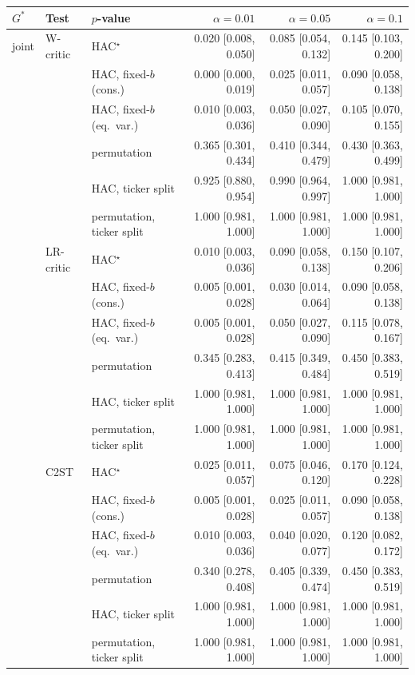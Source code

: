 \begin{tabular}{lllrrr}
\toprule
$G^*$ & Test & $p$-value & $\alpha=0.01$ & $\alpha=0.05$ & $\alpha=0.1$ \\
\midrule
joint & W-critic & HAC$^{\star}$ & 0.020 [0.008, 0.050] & 0.085 [0.054, 0.132] & 0.145 [0.103, 0.200] \\
 &  & HAC, fixed-$b$ (cons.) & 0.000 [0.000, 0.019] & 0.025 [0.011, 0.057] & 0.090 [0.058, 0.138] \\
 &  & HAC, fixed-$b$ (eq.\ var.) & 0.010 [0.003, 0.036] & 0.050 [0.027, 0.090] & 0.105 [0.070, 0.155] \\
 &  & permutation & 0.365 [0.301, 0.434] & 0.410 [0.344, 0.479] & 0.430 [0.363, 0.499] \\
 &  & HAC, ticker split & 0.925 [0.880, 0.954] & 0.990 [0.964, 0.997] & 1.000 [0.981, 1.000] \\
 &  & permutation, ticker split & 1.000 [0.981, 1.000] & 1.000 [0.981, 1.000] & 1.000 [0.981, 1.000] \\
 & LR-critic & HAC$^{\star}$ & 0.010 [0.003, 0.036] & 0.090 [0.058, 0.138] & 0.150 [0.107, 0.206] \\
 &  & HAC, fixed-$b$ (cons.) & 0.005 [0.001, 0.028] & 0.030 [0.014, 0.064] & 0.090 [0.058, 0.138] \\
 &  & HAC, fixed-$b$ (eq.\ var.) & 0.005 [0.001, 0.028] & 0.050 [0.027, 0.090] & 0.115 [0.078, 0.167] \\
 &  & permutation & 0.345 [0.283, 0.413] & 0.415 [0.349, 0.484] & 0.450 [0.383, 0.519] \\
 &  & HAC, ticker split & 1.000 [0.981, 1.000] & 1.000 [0.981, 1.000] & 1.000 [0.981, 1.000] \\
 &  & permutation, ticker split & 1.000 [0.981, 1.000] & 1.000 [0.981, 1.000] & 1.000 [0.981, 1.000] \\
 & C2ST & HAC$^{\star}$ & 0.025 [0.011, 0.057] & 0.075 [0.046, 0.120] & 0.170 [0.124, 0.228] \\
 &  & HAC, fixed-$b$ (cons.) & 0.005 [0.001, 0.028] & 0.025 [0.011, 0.057] & 0.090 [0.058, 0.138] \\
 &  & HAC, fixed-$b$ (eq.\ var.) & 0.010 [0.003, 0.036] & 0.040 [0.020, 0.077] & 0.120 [0.082, 0.172] \\
 &  & permutation & 0.340 [0.278, 0.408] & 0.405 [0.339, 0.474] & 0.450 [0.383, 0.519] \\
 &  & HAC, ticker split & 1.000 [0.981, 1.000] & 1.000 [0.981, 1.000] & 1.000 [0.981, 1.000] \\
 &  & permutation, ticker split & 1.000 [0.981, 1.000] & 1.000 [0.981, 1.000] & 1.000 [0.981, 1.000] \\

\end{tabular}
